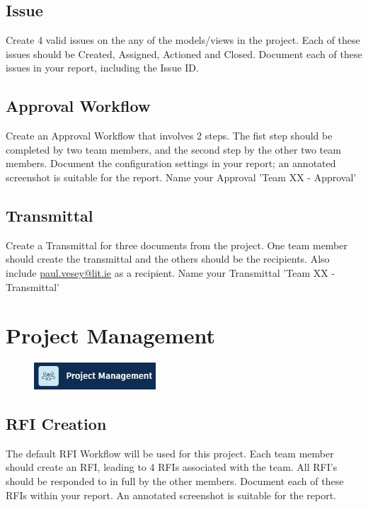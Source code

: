 \subsection{Issue}

Create 4 valid issues on the any of the models/views in the project.  Each of these issues should be Created, Assigned, Actioned and Closed.  Document each of these issues in your report, including the Issue ID.

\subsection{Approval Workflow}

Create an Approval Workflow that involves 2 steps.  The fist step should be completed by two team members, and the second step by the other two team members.  Document the configuration settings in your report; an annotated screenshot is suitable for the report.  Name your Approval 'Team XX - Approval' 

\subsection{Transmittal}

Create a Transmittal for three documents from the project.  One team member should create the transmittal and the others should be the recipients.  Also include \href{mailto:paul.vesey@lit.ie}{paul.vesey@lit.ie} as a recipient.  Name your Transmittal 'Team XX - Transmittal'


\section{Project Management}

\begin{figure}[h!t]
	\includegraphics[height=1.0cm]{RevitAssets/projmgmt}
	\label{fig:projmgmt}
\end{figure}



\subsection{RFI Creation}
The default RFI Workflow will be used for this project.  Each team member should create an RFI, leading to 4 RFIs associated with the team.  All RFI's should be responded to in full by the other members.  Document each of these RFIs within your report. An annotated screenshot is suitable for the report. 



